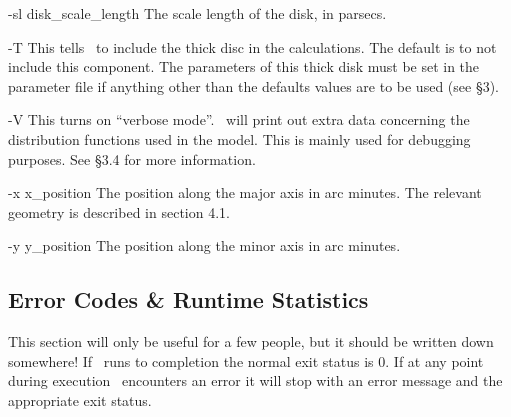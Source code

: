 \begin{clo}{-sl disk\_scale\_length}
The scale length of the disk, in parsecs.
\end{clo}

\begin{clo}{-T}
This tells \egm\ to include the thick disc in the calculations. The default
is to not include this component. The parameters of this thick disk must be
set in the parameter file if anything other than the defaults values are to
be used (see \S3).
\end{clo}

\begin{clo}{-V}
This turns on ``verbose mode''. \egm\ will print out extra data 
concerning the distribution functions used in the model. This is
mainly used for debugging purposes. See \S3.4 for more information.
\end{clo}

\begin{clo}{-x x\_position}
The position along the major axis in arc minutes. The relevant geometry is
described in section 4.1.
\end{clo}

\begin{clo}{-y y\_position}
The position along the minor axis in arc minutes.
\end{clo}

\subsection{Error Codes \& Runtime Statistics}

This section will only be useful for a few people, but it should be written
down somewhere! If \egm\ runs to completion the normal exit status is 0.
If at any point during execution \egm\ encounters an error it will stop
with an error message and the appropriate exit status.

